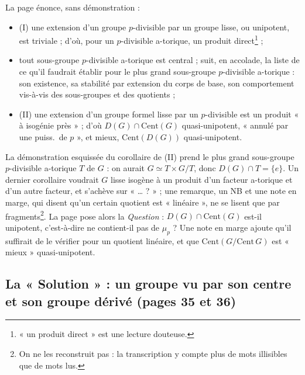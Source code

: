 \documentclass[11pt,a4paper]{article}
\begin{document}
La page énonce, sans démonstration :
\begin{itemize}
  \item (I) une extension d'un groupe $p$-divisible par un groupe lisse, ou
  unipotent, est triviale ; d'où, pour un $p$-divisible a-torique, un
  produit direct\footnote{« un produit direct » est une lecture douteuse.} ;
  \item tout sous-groupe $p$-divisible a-torique est central ; suit, en
  accolade, la liste de ce qu'il faudrait établir pour le plus grand
  sous-groupe $p$-divisible a-torique : son existence, sa stabilité par
  extension du corps de base, son comportement vis-à-vis des sous-groupes et
  des quotients ;
  \item (II) une extension d'un groupe formel lisse par un $p$-divisible est
  un produit « à isogénie près » ; d'où
  $D(G) \cap \mathrm{Cent}(G)$ quasi-unipotent, « annulé par une puiss.\ de $p$ », et
  mieux, $\mathrm{Cent}(D(G))$ quasi-unipotent.
\end{itemize}
La démonstration esquissée du corollaire de (II) prend le plus grand
sous-groupe $p$-divisible a-torique $T$ de $G$ : on aurait
$G \simeq T \times G/T$, donc $D(G) \cap T = \{e\}$. Un dernier corollaire
voudrait $G$ lisse isogène à un produit d'un facteur a-torique et d'un
autre facteur, et s'achève sur « … ? » ; une remarque, un NB et une note
en marge, qui disent qu'un certain quotient est « linéaire », ne se lisent
que par fragments\footnote{On ne les reconstruit pas : la transcription y
compte plus de mots illisibles que de mots lus.}. La page pose alors la
\emph{Question} : $D(G) \cap \mathrm{Cent}(G)$ est-il unipotent,
c'est-à-dire ne contient-il pas de $\mu_p$ ? Une note en marge ajoute qu'il
suffirait de le vérifier pour un quotient linéaire, et que
$\mathrm{Cent}(G/\mathrm{Cent}\,G)$ est « mieux » quasi-unipotent.

\subsection*{La « Solution » : un groupe vu par son centre et son groupe dérivé (pages 35 et 36)}
\end{document}
